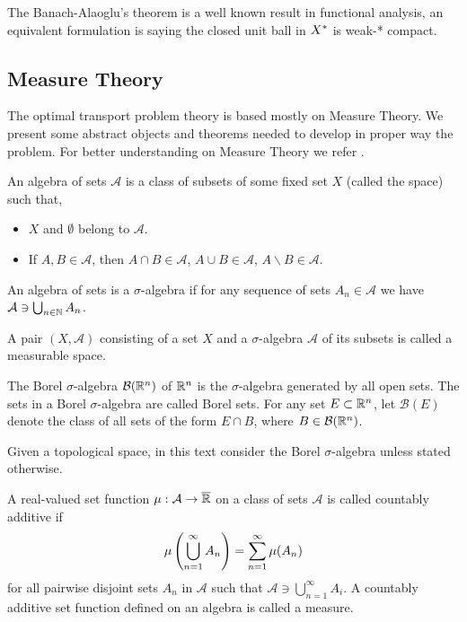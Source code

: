 The Banach-Alaoglu's theorem is a well known result in functional analysis, an equivalent formulation is saying the closed unit ball in ${X}^*$ is weak-* compact.

\subsection{Measure Theory}

The optimal transport problem theory is based mostly on Measure Theory. We present some abstract objects and theorems needed to develop in proper way the problem. For better understanding on Measure Theory we refer \cite{bogachev2007Measure}. 
\begin{definition}
	An algebra of sets $\mathcal{A}$ is a class of subsets of some fixed set $X$ (called the space) such that,
	\begin{itemize}
		\item $X$ and $\emptyset$ belong to $\mathcal{A}$.
		\item If $A, B \in \mathcal{A}$, then $A\cap B \in \mathcal{A}$, $A\cup B \in \mathcal A$, $A\backslash B \in \mathcal A$.
	\end{itemize}
	An algebra of sets is a $\sigma$-algebra if for any sequence of sets $A_n \in \mathcal A$ we have $\mathcal{A}\ni \bigcup_{n\in \mathbb{N}} A_n $.
\end{definition}

\begin{definition} 
	A pair $(X, \mathcal A)$ consisting of a set $X$ and a $\sigma$-algebra $\mathcal A$ of its subsets is called a measurable space.
\end{definition}

\begin{definition}
	The Borel $\sigma$-algebra $\mathcal{B}(\mathbb{R}^n)$ of $\mathbb{R}^n$ is the $\sigma$-algebra generated by all open sets. The sets in a Borel $\sigma$-algebra are called Borel sets. For any set $E\subset \mathbb{R}^n$, let $\mathcal B(E)$ denote the class of all sets of the form $E\cap B$, where $B\in\mathcal B(\mathbb{R}^n)$.
\end{definition}

Given a topological space, in this text consider the Borel $\sigma$-algebra unless stated otherwise. 

\begin{definition}[Measure]
	A real-valued set function $\mu:\mathcal{A}\rightarrow \overline{\mathbb{R}}$ on a class of sets $\mathcal A$ is called countably additive if 
	\begin{equation*}
		\mu\left( \bigcup_{n=1}^{\infty} A_n \right)=\sum_{n=1}^{\infty}\mu(A_n)
	\end{equation*}
	for all pairwise disjoint sets $A_n$ in $\mathcal A$ such that $\mathcal A \ni \bigcup_{n=1}^{\infty}A_i$. A countably additive set function defined on an algebra is called a measure.
\end{definition}

